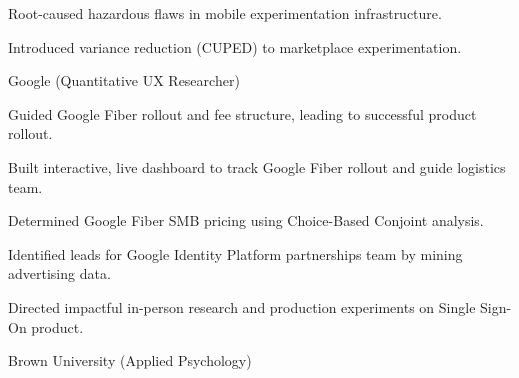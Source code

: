 \documentclass[12pt]{res}
\begin{document}
{\begin{resume}
\begin{list}{}{\leftmargin=1em}
\begin{list}{-}{\leftmargin=1em}
\item Root-caused hazardous flaws in mobile experimentation infrastructure.
\item Introduced variance reduction (CUPED) to marketplace experimentation.
\end{list}
\item \raggedright{Google (Quantitative UX Researcher)\dotfill}
\begin{list}{-}{\leftmargin=1em}
\item Guided Google Fiber rollout and fee structure, leading to successful product rollout.
\item Built interactive, live dashboard to track Google Fiber rollout and guide logistics team.
\item Determined Google Fiber SMB pricing using Choice-Based Conjoint analysis.
\item Identified leads for Google Identity Platform partnerships team by mining advertising data.
\item Directed impactful in-person research and production experiments on Single Sign-On product.
\end{list}
\item {}
\item \raggedright{Brown University (Applied Psychology)}\dotfill {}
\item
\end{list}
\end{resume}
} %
\end{document}
